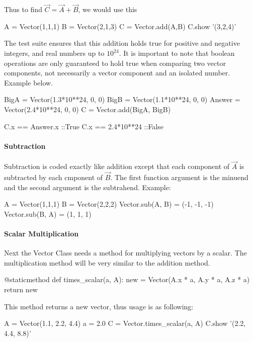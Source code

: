 \documentclass[15pt]{report}
\begin{document}
Thus to find $\vec{C} =\vec{A} + \vec{B}$, we would use this

\begin{code}
A = Vector(1,1,1)
B = Vector(2,1,3)
C = Vector.add(A,B)
C.show
'(3,2,4)'
\end{code} 

The test suite ensures that this addition holds true for positive and negative integers, and real numbers up to $10^{24}$. It is important to note that boolean operations are only guaranteed to hold true when comparing two vector components, not necessarily a vector component and an isolated number. Example below.

\begin{code}
BigA = Vector(1.3*10**24, 0, 0)
BigB = Vector(1.1*10**24, 0, 0)
Answer = Vector(2.4*10**24, 0, 0)
C = Vector.add(BigA, BigB)

C.x == Answer.x        ::True
C.x == 2.4*10**24      ::False
\end{code} 

\paragraph{Subtraction}Subtraction is coded exactly like addition except that each component of $\vec{A}$ is subtracted by each cmponent of $\vec{B}$. The first function argument is the minuend and the second argument is the subtrahend. Example:

\begin{code}
A = Vector(1,1,1)
B = Vector(2,2,2)
Vector.sub(A, B) = (-1, -1, -1)
Vector.sub(B, A) = (1, 1, 1)
\end{code}

\paragraph{Scalar Multiplication} Next the Vector Class needs a method for multiplying vectors by a scalar. The multiplication method will be very similar to the addition method.

\begin{code}
@staticmethod
def times_scalar(a, A):
    new = Vector(A.x * a, 
                 A.y * a,
                 A.z * a)
    return new
\end{code}

This method returns a new vector, thus usage is as following:

\begin{code}
A = Vector(1.1, 2.2, 4.4)
a = 2.0
C = Vector.times_scalar(a, A)
C.show
'(2.2, 4.4, 8.8)'
\end{code}
\end{document}
